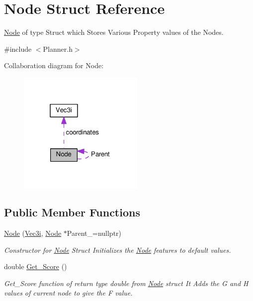 \hypertarget{structNode}{}\section{Node Struct Reference}
\label{structNode}


\hyperlink{structNode}{Node} of type Struct which Stores Various Property values of the Nodes.  




{\ttfamily \#include $<$Planner.\+h$>$}



Collaboration diagram for Node\+:\nopagebreak
\begin{figure}[H]
\begin{center}
\leavevmode
\includegraphics[width=171pt]{structNode__coll__graph}
\end{center}
\end{figure}
\subsection*{Public Member Functions}
\begin{DoxyCompactItemize}
\item 
\hyperlink{structNode_a947e5d8f76e9600c262ad97aefa67d8e}{Node} (\hyperlink{structVec3i}{Vec3i}, \hyperlink{structNode}{Node} $\ast$Parent\+\_\+=nullptr)
\begin{DoxyCompactList}\small\item\em Constructor for \hyperlink{structNode}{Node} Struct Initializes the \hyperlink{structNode}{Node} features to default values. \end{DoxyCompactList}\item 
double \hyperlink{structNode_a4a45812196b32f307390cd277953a6a0}{Get\+\_\+\+Score} ()
\begin{DoxyCompactList}\small\item\em Get\+\_\+\+Score function of return type double from \hyperlink{structNode}{Node} struct It Adds the G and H values of current node to give the F value. \end{DoxyCompactList}\end{DoxyCompactItemize}
